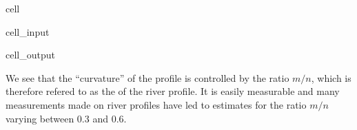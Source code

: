 \documentclass[letterpaper,10pt,english]{jupyterBook}
\begin{document}
\begin{sphinxuseclass}{cell}\begin{sphinxVerbatimInput}

\begin{sphinxuseclass}{cell_input}
\begin{sphinxVerbatim}[commandchars=\\\{\}]
  

   

  
   
      

\end{sphinxVerbatim}

\end{sphinxuseclass}\end{sphinxVerbatimInput}
\begin{sphinxVerbatimOutput}

\begin{sphinxuseclass}{cell_output}
\noindent{}

\end{sphinxuseclass}\end{sphinxVerbatimOutput}

\end{sphinxuseclass}
\sphinxAtStartPar
We see that the “curvature” of the profile is controlled by the ratio \(m/n\), which is therefore refered to as the  of the river profile. It is easily measurable and many measurements made on river profiles have led to estimates for the ratio \(m/n\) varying between 0.3 and 0.6.
\end{document}
